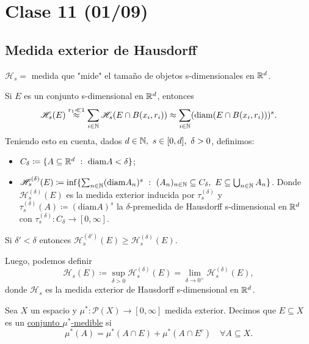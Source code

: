 \section{Clase 11 (01/09)}

\subsection*{Medida exterior de Hausdorff}

$\mathscr{H}_s =$ medida que "mide" el tamaño de objetos s-dimensionales en $\mathbb{R}^d$. \newline

Si $E$ es un conjunto s-dimensional en $\mathbb{R}^d$, entonces
\[
	\mathscr{H}_s (E) \stackrel{r_1 \ll 1}{\approx} \sum_{i\in\mathbb{N}} \mathscr{H}_s(E \cap B(x_i,r_i)) \approx \sum_{i\in\mathbb{N}} (\text{diam}(E \cap B(x_i,r_i)))^s
.\] 
Teniendo esto en cuenta, dados $d \in \mathbb{N},\ s \in [0,d],\ \delta > 0$, definimos:
\begin{itemize}
	\item $C_{\delta} \coloneq \{ A \subseteq \mathbb{R}^d \ : \ \text{diam}A < \delta \}$;

	\item $\mathscr{H}_{s}^{(\delta)} (E) \coloneq \inf \{ \sum_{n\in\mathbb{N}} (\text{diam}A_n)^s \ : \ (A_n)_{n\in\mathbb{N}} \subseteq C_{\delta},\ E \subseteq \bigcup_{n\in\mathbb{N}} A_n \}$. Donde $\mathscr{H}_{s}^{(\delta)} (E)$ es la medida exterior inducida por $\tau_{s}^{(\delta)}$ y $\tau_{s}^{(\delta)}(A) \coloneq (\text{diam}A)^s$ la $\delta$-premedida de Hausdorff s-dimensional en $\mathbb{R}^d$ con $\tau_{s}^{(\delta)} : C_{\delta} \to [0,\infty]$.
\end{itemize}

\begin{observe}
	Si $\delta' < \delta$ entonces $\mathscr{H}_{s}^{(\delta')}(E) \geq \mathscr{H}_{s}^{(\delta)} (E)$.
\end{observe}

\noindent Luego, podemos definir
\[
	\mathscr{H}_s(E) \coloneq \sup_{\delta>0} \mathscr{H}_{s}^{(\delta)}(E) = \lim_{\delta \to 0^{+}} \mathscr{H}_{s}^{(\delta)} (E) 
,\] 
donde $\mathscr{H}_s$ es la medida exterior de Hausdorff s-dimensional en $\mathbb{R}^d$.

\begin{definition}
	Sea $X$ un espacio y $\mu^{*} : \mathcal{P}(X) \to [0,\infty]$ medida exterior. Decimos que $E \subseteq X$ es un \underline{conjunto $\mu^{*}$-medible} si
	\[
		\mu^{*}(A) = \mu^{*}(A \cap E) + \mu^{*}(A \cap E^c) \quad \forall A \subseteq X
	.\] 
\end{definition}


